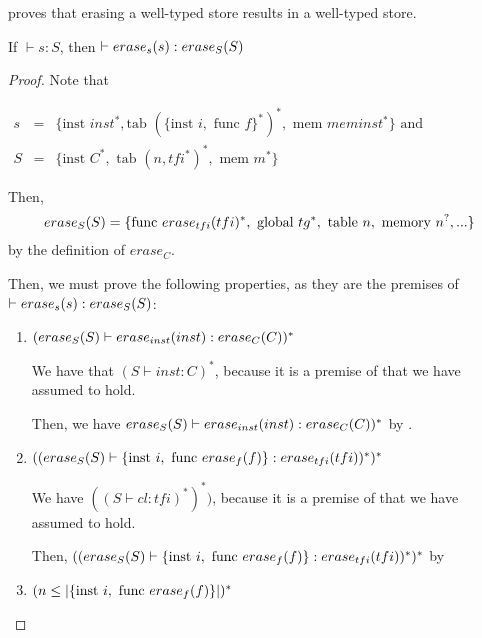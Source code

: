  proves that erasing a well-typed \name store results in a well-typed \wasm store.

\begin{lemma}{}

    If $\vdash s : S$, then $\vdash \erase[s]{s} : \erase[S]{S}$
\end{lemma}
\begin{proof}

    Note that

    \begin{math}
        \begin{array}{rcl}
            s &=& \{\text{inst } inst^{*}, \text{tab } (\{\text{inst } i, \text{ func } f\}^{*})^{*}, \text{ mem } meminst^{*}\} \text{ and}\\
            S &=& \{\text{inst } C^{*}, \text{ tab } (n,tfi^{*})^{*}, \text{ mem } m^{*}\}
        \end{array}
    \end{math}

    Then, $$\erase[S]{S}=\{\text{func } \erase[tfi]{tfi}^{*}, \text{ global } tg^{*}, \text{ table } n, \text{ memory } n^{?}, ...\}$$ by the definition of $erase_C$.

    Then, we must prove the following properties, as they are the premises of $\vdash \erase[s]{s} : \erase[S]{S}$:
    \begin{enumerate}
        \item $(\erase[S]{S} \vdash \erase[inst]{inst} : \erase[C]{C})^{*}$

        We have that $(S \vdash inst : C)^{*}$, because it is a premise of  that we have assumed to hold.

        Then, we have $\erase[S]{S} \vdash \erase[inst]{inst} : \erase[C]{C})^{*}$ by .

        \item $((\erase[S]{S} \vdash \{\text{inst } i, \text{ func } \erase[f]{f}\} : \erase[tfi]{tfi})^{*})^{*}$

        We have $((S \vdash cl :  tfi)^{*})^{*})$, because it is a premise of  that we have assumed to hold.

        Then, $((\erase[S]{S} \vdash \{\text{inst } i, \text{ func } \erase[f]{f}\} : \erase[tfi]{tfi})^{*})^{*}$ by 

        \item $(n \leq |\{\text{inst } i, \text{ func } \erase[f]{f}\}|)^{*}$


\end{enumerate}
\end{proof}
